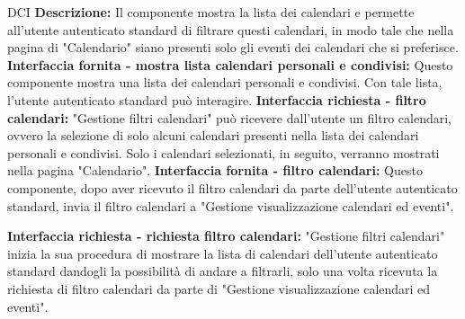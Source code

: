 \begin{listaPersonale}{DCI}
    \textbf{Descrizione:} Il componente mostra la lista dei calendari e permette all'utente autenticato standard di filtrare questi calendari, in modo tale che nella pagina di "Calendario" siano presenti solo gli eventi dei calendari che si preferisce.
    \textbf{Interfaccia fornita - mostra lista calendari personali e condivisi:} Questo componente mostra una lista dei calendari personali e condivisi. Con tale lista, l'utente autenticato standard può interagire.
    \textbf{Interfaccia richiesta - filtro calendari:} "Gestione filtri calendari" può ricevere dall'utente un filtro calendari, ovvero la selezione di solo alcuni calendari presenti nella lista dei calendari personali e condivisi. Solo i calendari selezionati, in seguito, verranno mostrati nella pagina "Calendario".
    \textbf{Interfaccia fornita - filtro calendari:} Questo componente, dopo aver ricevuto il filtro calendari da parte dell'utente autenticato standard, invia il filtro calendari a "Gestione visualizzazione calendari ed eventi".

    \textbf{Interfaccia richiesta - richiesta filtro calendari:} "Gestione filtri calendari" inizia la sua procedura di mostrare la lista di calendari dell'utente autenticato standard dandogli la possibilità di andare a filtrarli, solo una volta ricevuta la richiesta di filtro calendari da parte di "Gestione visualizzazione calendari ed eventi".



\end{listaPersonale}
